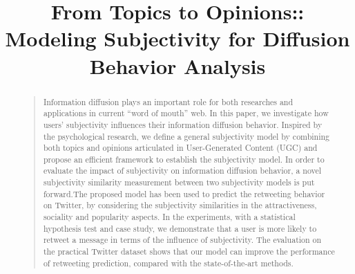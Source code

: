 \documentclass[letterpaper]{article}
\begin{document}
%
\title{From Topics to Opinions:: \\Modeling Subjectivity for Diffusion Behavior Analysis}
\nocopyright
\maketitle
\begin{abstract}
\begin{quote}
Information diffusion plays an important role for both researches and applications in current ``word of mouth'' web. In this paper, we investigate how users' subjectivity influences their information diffusion behavior. 
Inspired by the psychological research, we define a general subjectivity model by combining both topics and opinions articulated in User-Generated Content (UGC) and propose an efficient framework to establish the subjectivity model. 
In order to evaluate the impact of subjectivity on information diffusion behavior, a novel subjectivity similarity measurement between two subjectivity models is put forward.The proposed model has been used to predict the retweeting  behavior on Twitter, by considering the subjectivity similarities in the attractiveness, sociality and popularity aspects. In the experiments, with a statistical hypothesis test and case study, we demonstrate that a user is more likely to retweet a message in terms of the influence of subjectivity. The evaluation on the practical Twitter dataset shows that our  model can improve the performance of retweeting prediction, compared with the state-of-the-art methods.
\end{quote}
\end{abstract}
\end{document}
